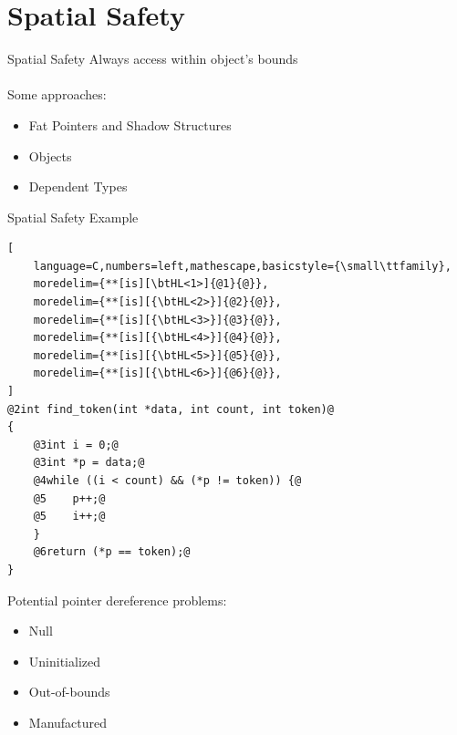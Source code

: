 \documentclass[aspectratio=169]{beamer}
\begin{document}


\section{Spatial Safety}

\begin{frame}{Spatial Safety}
Always access within object's \alert{bounds}
\\
\pause
\vspace{0.2in}
\\
Some approaches:
\begin{itemize}
      \item Fat Pointers and Shadow Structures
      \item Objects
      \item Dependent Types
  \end{itemize}
\end{frame}

\begin{frame}[fragile]{Spatial Safety Example}
\footnotesize
\begin{lstlisting}[
    language=C,numbers=left,mathescape,basicstyle={\small\ttfamily},
    moredelim={**[is][\btHL<1>]{@1}{@}},
    moredelim={**[is][{\btHL<2>}]{@2}{@}},
    moredelim={**[is][{\btHL<3>}]{@3}{@}},
    moredelim={**[is][{\btHL<4>}]{@4}{@}},
    moredelim={**[is][{\btHL<5>}]{@5}{@}},
    moredelim={**[is][{\btHL<6>}]{@6}{@}},
]
@2int find_token(int *data, int count, int token)@
{
    @3int i = 0;@
    @3int *p = data;@
    @4while ((i < count) && (*p != token)) {@
    @5    p++;@
    @5    i++;@
    }
    @6return (*p == token);@
}
\end{lstlisting}


\footnotesize{
Potential pointer dereference problems:
  \begin{itemize}
      \item Null
      \item Uninitialized
      \item Out-of-bounds 
      \item Manufactured 
  \end{itemize}
}
\end{frame}
\end{document}
